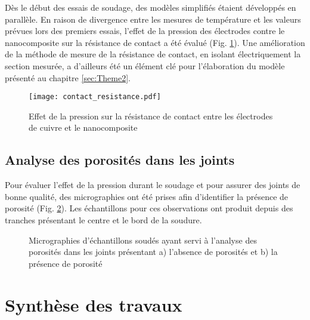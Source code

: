 Dès le début des essais de soudage, des modèles simplifiés étaient développés en parallèle. 
En raison de divergence entre les mesures de température et les valeurs prévues lors des premiers essais, l'effet de la pression des électrodes contre le nanocomposite sur la résistance de contact a été évalué (Fig. \ref{fig:resistance_contact}). 
Une amélioration de la méthode de mesure de la résistance de contact, en isolant électriquement la section mesurée, a d'ailleurs été un élément clé pour l'élaboration du modèle présenté au chapitre \ref{sec:Theme2}. 

\begin{figure}[h]
	\centering
	\texttt{[image: contact\_resistance.pdf]}
	\caption{Effet de la pression sur la résistance de contact entre les électrodes de cuivre et le nanocomposite}
	\label{fig:resistance_contact}
\end{figure}

\FloatBarrier
\subsection{Analyse des porosités dans les joints}

Pour évaluer l'effet de la pression durant le soudage et pour assurer des joints de bonne qualité, des micrographies ont été prises afin d'identifier la présence de porosité (Fig. \ref{fig:micro_analyse_porosite}). 
Les échantillons pour ces observations ont produit depuis des tranches présentant le centre et le bord de la soudure. 

\begin{figure}[h!]
	\centering
	 \qquad
	\caption{Micrographies d'échantillons soudés ayant servi à l'analyse des porosités dans les joints présentant a) l'absence de porosités et b) la présence de porosité}
	\label{fig:micro_analyse_porosite}
\end{figure}

\FloatBarrier
\section{Synthèse des travaux}

